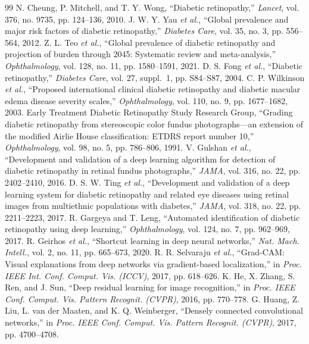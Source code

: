 \documentclass[conference]{IEEEtran}
\begin{document}
\begin{thebibliography}{99}
 N. Cheung, P. Mitchell, and T. Y. Wong, ``Diabetic retinopathy,'' \emph{Lancet}, vol. 376, no. 9735, pp. 124--136, 2010.
 J. W. Y. Yau \emph{et al.}, ``Global prevalence and major risk factors of diabetic retinopathy,'' \emph{Diabetes Care}, vol. 35, no. 3, pp. 556--564, 2012.
 Z. L. Teo \emph{et al.}, ``Global prevalence of diabetic retinopathy and projection of burden through 2045: Systematic review and meta-analysis,'' \emph{Ophthalmology}, vol. 128, no. 11, pp. 1580--1591, 2021.
 D. S. Fong \emph{et al.}, ``Diabetic retinopathy,'' \emph{Diabetes Care}, vol. 27, suppl.~1, pp. S84--S87, 2004.
 C. P. Wilkinson \emph{et al.}, ``Proposed international clinical diabetic retinopathy and diabetic macular edema disease severity scales,'' \emph{Ophthalmology}, vol. 110, no. 9, pp. 1677--1682, 2003.
 Early Treatment Diabetic Retinopathy Study Research Group, ``Grading diabetic retinopathy from stereoscopic color fundus photographs---an extension of the modified Airlie House classification: ETDRS report number 10,'' \emph{Ophthalmology}, vol. 98, no. 5, pp. 786--806, 1991.
 V. Gulshan \emph{et al.}, ``Development and validation of a deep learning algorithm for detection of diabetic retinopathy in retinal fundus photographs,'' \emph{JAMA}, vol. 316, no. 22, pp. 2402--2410, 2016.
 D. S. W. Ting \emph{et al.}, ``Development and validation of a deep learning system for diabetic retinopathy and related eye diseases using retinal images from multiethnic populations with diabetes,'' \emph{JAMA}, vol. 318, no. 22, pp. 2211--2223, 2017.
 R. Gargeya and T. Leng, ``Automated identification of diabetic retinopathy using deep learning,'' \emph{Ophthalmology}, vol. 124, no. 7, pp. 962--969, 2017.
 R. Geirhos \emph{et al.}, ``Shortcut learning in deep neural networks,'' \emph{Nat. Mach. Intell.}, vol. 2, no. 11, pp. 665--673, 2020.
 R. R. Selvaraju \emph{et al.}, ``Grad-CAM: Visual explanations from deep networks via gradient-based localization,'' in \emph{Proc. IEEE Int. Conf. Comput. Vis. (ICCV)}, 2017, pp. 618--626.
 K. He, X. Zhang, S. Ren, and J. Sun, ``Deep residual learning for image recognition,'' in \emph{Proc. IEEE Conf. Comput. Vis. Pattern Recognit. (CVPR)}, 2016, pp. 770--778.
 G. Huang, Z. Liu, L. van der Maaten, and K. Q. Weinberger, ``Densely connected convolutional networks,'' in \emph{Proc. IEEE Conf. Comput. Vis. Pattern Recognit. (CVPR)}, 2017, pp. 4700--4708.

\end{thebibliography}
\end{document}
